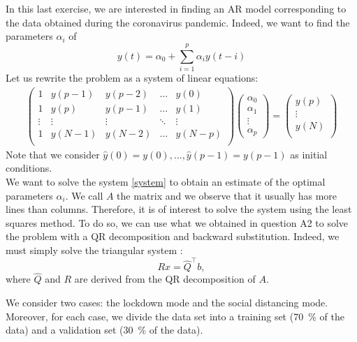 \documentclass[11pt]{article}
\begin{document}
In this last exercise, we are interested in finding an AR model corresponding to the data obtained during the coronavirus pandemic. Indeed, we want to find the parameters $\alpha_i$ of
\[y(t) = \alpha_0 + \sum_{i=1}^p \alpha_iy(t-i)
\]
Let us rewrite the problem as a system of linear equations:
\begin{align}\label{system}
\begin{pmatrix}
1 & y(p-1)& y(p-2)&\dots& y(0)\\
1 & y(p)&y(p-1)&\dots& y(1)\\
\vdots&\vdots &\vdots&\ddots&\vdots\\
1& y(N-1)&y(N-2)&\dots& y(N-p)\\
\end{pmatrix}
\begin{pmatrix}
\alpha_0\\
\alpha_1\\
\vdots\\
\alpha_p
\end{pmatrix}
=
\begin{pmatrix}
y(p)\\
\vdots\\
y(N)\\
\end{pmatrix}
\end{align}
Note that we consider $\hat{y}(0) = y(0),\dots, \hat{y}(p-1) = y(p-1)$ as initial conditions.\\ 
We want to solve the system \eqref{system} to obtain an estimate of the optimal parameters $\alpha_i$. We call $A$ the matrix and we observe that it usually has more lines than columns. Therefore, it is of interest to solve the system using the least squares method. To do so, we can use what we obtained in question A2 to solve the problem with a QR decomposition and backward substitution. Indeed, we must simply solve the triangular system :
\begin{equation*}
    Rx = \hat{Q}^\top b,
\end{equation*}
where $\hat{Q}$ and $R$ are derived from the QR decomposition of $A$.

We consider two cases: the lockdown mode and the social distancing mode. Moreover, for each case, we divide the data set into a training set (\SI{70}{\percent} of the data) and a validation set (\SI{30}{\percent} of the data).
\end{document}
